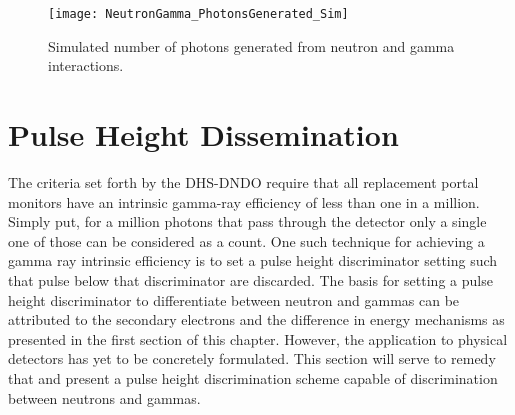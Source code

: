 \begin{figure}
  \centering
  \texttt{[image: NeutronGamma\_PhotonsGenerated\_Sim]}
  \caption[Number of photons generated of a 1 mm for neutron and gamma interactions]{Simulated number of photons generated from neutron and gamma interactions.}
  \label{fig:NeutronGammaPhotonsGenSim}
\end{figure}

\section{Pulse Height Dissemination}
\label{sec:PulseHeightDiscrm}
The criteria set forth by the DHS-DNDO require that all replacement portal monitors have an intrinsic gamma-ray efficiency of less than one in a million.
Simply put, for a million photons that pass through the detector only a single one of those can be considered as a count.
One such technique for achieving a gamma ray intrinsic efficiency is to set a pulse height discriminator setting such that pulse below that discriminator are discarded.
The basis for setting a pulse height discriminator to differentiate between neutron and gammas can be attributed to the secondary electrons and the difference in energy mechanisms as presented in the first section of this chapter.
However, the application to physical detectors has yet to be concretely formulated.
This section will serve to remedy that and present a pulse height discrimination scheme capable of discrimination between neutrons and gammas.

